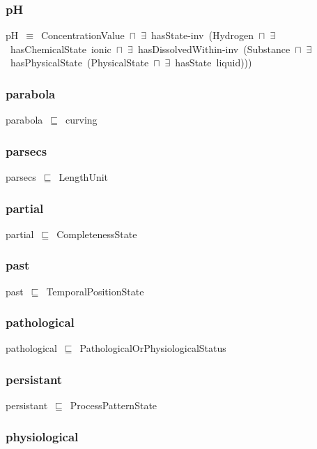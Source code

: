 \documentclass{article}
\begin{document}
\subsubsection*{pH}

pH~\ensuremath{\equiv}~ConcentrationValue~\ensuremath{\sqcap}~\ensuremath{\exists}~hasState-inv~(Hydrogen~\ensuremath{\sqcap}~\ensuremath{\exists}~hasChemicalState~ionic~\ensuremath{\sqcap}~\ensuremath{\exists}~hasDissolvedWithin-inv~(Substance~\ensuremath{\sqcap}~\ensuremath{\exists}~hasPhysicalState~(PhysicalState~\ensuremath{\sqcap}~\ensuremath{\exists}~hasState~liquid)))

\subsubsection*{parabola}

parabola~\ensuremath{\sqsubseteq}~curving~

\subsubsection*{parsecs}

parsecs~\ensuremath{\sqsubseteq}~LengthUnit~

\subsubsection*{partial}

partial~\ensuremath{\sqsubseteq}~CompletenessState~

\subsubsection*{past}

past~\ensuremath{\sqsubseteq}~TemporalPositionState~

\subsubsection*{pathological}

pathological~\ensuremath{\sqsubseteq}~PathologicalOrPhysiologicalStatus~

\subsubsection*{persistant}

persistant~\ensuremath{\sqsubseteq}~ProcessPatternState~

\subsubsection*{physiological}
\end{document}
